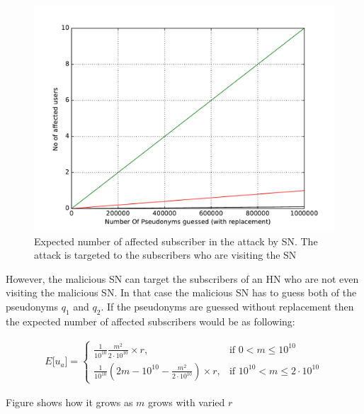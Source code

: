 \documentclass{llncs} %
\begin{document}
\begin{figure}[]
  \centering
    \includegraphics[width=\textwidth]{expected_success_rate_attack_by_sn_insider.pdf}
  \caption{Expected number of affected subscriber in the attack by SN. The attack is targeted to the subscribers who are visiting the SN}
  \label{fig:expected_success_rate_attack_by_sn_insider}	
\end{figure}


However, the malicious SN can target the subscribers of an HN who are not even visiting the malicious SN. In that case the malicious SN has to guess both of the pseudonyms $q_1$ and $q_2$. If the pseudonyms are guessed without replacement then the expected number of affected subscribers would be as following:

\begin{eqnarray}
E\big[ u_a \big] = \begin{cases} \frac{1}{10^{10}}\frac{m^2}{2\cdot 10^{10}} \times r, & \mbox{if } 0 < m \leq 10^{10} \\ 
\frac{1}{10^{10}}(2m - 10^{10} - \frac{m^2}{2\cdot 10^{10}}) \times r, & \mbox{if } 10^{10} < m \leq 2\cdot 10^{10} \end{cases}
\label{eqn:without_replacement}
\end{eqnarray} 

Figure shows how it grows as $m$ grows with varied $r$
\end{document}
